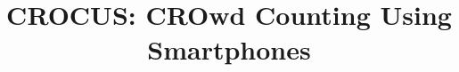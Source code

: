 \documentclass{llncs}
\begin{document}
\title{%
  CROCUS: CROwd Counting Using Smartphones 
}



\end{document}
